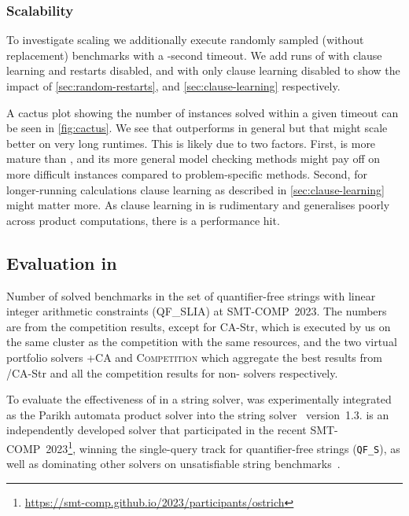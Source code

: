 \subsubsection{Scalability}\label{sec:scaling}%
To investigate scaling we additionally execute  randomly sampled
(without replacement) benchmarks with a -second timeout. We add
runs of \Calculus{} with clause learning and restarts disabled, and with only
clause learning disabled to show the impact of \cref{sec:random-restarts}, and
\cref{sec:clause-learning} respectively.

A cactus plot showing the number of instances solved within a given timeout can
be seen in \cref{fig:cactus}. We see that \Calculus{} outperforms \Nuxmv{} in
general but that \Nuxmv{} might scale better on very long runtimes. This is
likely due to two factors. First, \Nuxmv{} is more mature than \Calculus{}, and
its more general model checking methods might pay off on more difficult
instances compared to problem-specific methods. Second, for longer-running
calculations clause learning as described in \cref{sec:clause-learning} might
matter more. As clause learning in \Catra{} is rudimentary and generalises
poorly across product computations, there is a performance hit.

\subsection{Evaluation in \Ostrich{}}\label{}%

\begin{table}
  \begin{center}
  
  \end{center}
  \caption{Number of solved benchmarks in the set of quantifier-free strings with
    linear integer arithmetic constraints (QF\_SLIA) at SMT-COMP~2023. The numbers are from
    the competition results, except for CA-Str, which is executed by us on the same 
    cluster as the competition with the same resources, and the two virtual portfolio solvers
    \Ostrich+CA and \textsc{Competition} which aggregate the best results from \Ostrich{}/CA-Str and 
    all the competition results for non-\Ostrich{} solvers respectively. }
  \label{tab:solve-status-smt-comp}
\end{table}

To evaluate the effectiveness of \Calculus{} in a string solver, \Catra{} was
experimentally integrated as the Parikh automata product solver into the string
solver \Ostrich{}~version~1.3. \Ostrich{} is an independently developed solver
that participated in the recent
SMT-COMP~2023\footnote{\url{https://smt-comp.github.io/2023/participants/ostrich}},
winning the single-query track for quantifier-free strings (\texttt{QF\_S}), as
well as dominating other solvers on unsatisfiable string
benchmarks~\cite{smt-comp-23}.

